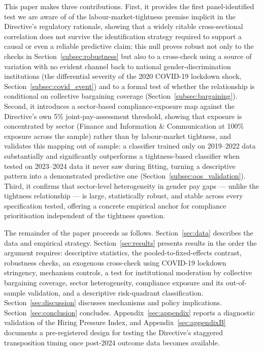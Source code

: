 \documentclass[12pt,a4paper]{article}
\begin{document}
This paper makes three contributions.  First, it provides the first
panel-identified test we are aware of of the labour-market-tightness premise
implicit in the Directive's regulatory rationale, showing that a widely citable
cross-sectional correlation does not survive the identification strategy
required to support a causal or even a reliable predictive claim; this null
proves robust not only to the checks in Section~\ref{subsec:robustness} but also
to a cross-check using a source of variation with no evident channel back to
national gender-discrimination institutions (the differential severity of the
2020 COVID-19 lockdown shock, Section~\ref{subsec:covid_event}) and to a formal
test of whether the relationship is conditional on collective bargaining
coverage (Section~\ref{subsec:bargaining}).  Second, it introduces a sector-based
compliance-exposure map against the Directive's own 5\% joint-pay-assessment
threshold, showing that exposure is concentrated by sector (Finance and
Information \& Communication at 100\% exposure across the sample) rather than by
labour-market tightness, and validates this mapping out of sample: a classifier
trained only on 2019--2022 data substantially and significantly outperforms a
tightness-based classifier when tested on 2023--2024 data it never saw during
fitting, turning a descriptive pattern into a demonstrated predictive one
(Section~\ref{subsec:oos_validation}).  Third, it confirms that sector-level
heterogeneity in gender pay gaps --- unlike the tightness relationship --- is
large, statistically robust, and stable across every specification tested,
offering a concrete empirical anchor for compliance prioritisation independent
of the tightness question.

The remainder of the paper proceeds as follows.  Section~\ref{sec:data}
describes the data and empirical strategy.  Section~\ref{sec:results} presents
results in the order the argument requires: descriptive statistics, the
pooled-to-fixed-effects contrast, robustness checks, an exogenous cross-check
using COVID-19 lockdown stringency, mechanism controls, a test for institutional
moderation by collective bargaining coverage, sector heterogeneity, compliance
exposure and its out-of-sample validation, and a descriptive risk-quadrant
classification.  Section~\ref{sec:discussion} discusses mechanisms and policy
implications.  Section~\ref{sec:conclusion} concludes.  Appendix~\ref{sec:appendix}
reports a diagnostic validation of the Hiring Pressure Index, and
Appendix~\ref{sec:appendixB} documents a pre-registered design for testing the
Directive's staggered transposition timing once post-2024 outcome data becomes
available.
\end{document}
